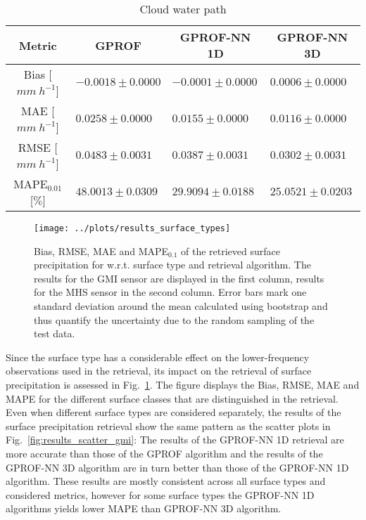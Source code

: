 \documentclass[a4paper,11pt,bibtotoc]{scrartcl}
\begin{document}
\begin{table}[hbpt!]
\begin{subtable}{\textwidth} 
 \caption{Cloud water path} 
\begin{tabular}{|c||p{3.5cm}|p{3.5cm}|p{3.5cm}|}
\hline
Metric &
\multicolumn{1}{|c}{GPROF} &
\multicolumn{1}{|c}{GPROF-NN 1D} &
\multicolumn{1}{|c|}{GPROF-NN 3D} \\
\hline\hline
Bias \hfill [$\unit{mm\ h^{-1}}$] & \hfill $ -0.0018 \pm 0.0000$ &\hfill $ -0.0001 \pm 0.0000$ &\hfill $  0.0006 \pm 0.0000$ \\
MAE \hfill [$\unit{mm\ h^{-1}}$] & \hfill $  0.0258 \pm 0.0000$ &\hfill $  0.0155 \pm 0.0000$ &\hfill $  0.0116 \pm 0.0000$ \\
RMSE \hfill [$\unit{mm\ h^{-1}}$] & \hfill $  0.0483 \pm 0.0031$ &\hfill $  0.0387 \pm 0.0031$ &\hfill $  0.0302 \pm 0.0031$ \\
MAPE$_{0.01}$ \hfill [$\unit{\%}$] & \hfill $ 48.0013 \pm 0.0309$ &\hfill $ 29.9094 \pm 0.0188$ &\hfill $ 25.0521 \pm 0.0203$ \\
\hline
\end{tabular}
\end{subtable}
\label{tab:surface_precip_metrics}
\end{table}

\begin{figure}[hbpt]
  \centering
  \texttt{[image: ../plots/results\_surface\_types]}
  \caption{
    Bias, RMSE, MAE and MAPE$_{0.1}$ of the retrieved surface precipitation for
    w.r.t. surface type and retrieval algorithm. The results for the GMI sensor
    are displayed in the first column, results for the MHS sensor in the
    second column. Error bars mark one standard deviation around the mean
    calculated using bootstrap and thus quantify the uncertainty due to the
    random sampling of the test data.
  }
  \label{fig:results_surface_types}
\end{figure}

Since the surface type has a considerable effect on the lower-frequency
observations used in the retrieval, its impact on the retrieval of surface
precipitation is assessed in Fig.~\ref{fig:results_surface_types}. The figure
displays the Bias, RMSE, MAE and MAPE for the different surface classes that are
distinguished in the retrieval. Even when different surface types are considered
separately, the results of the surface precipitation retrieval show the same
pattern as the scatter plots in Fig.~\ref{fig:results_scatter_gmi}: The results of
the GPROF-NN 1D retrieval are more accurate than those of the GPROF algorithm
and the results of the GPROF-NN 3D algorithm are in turn better than those of
the GPROF-NN 1D algorithm. These results are mostly consistent across all
surface types and considered metrics, however for some surface types the
GPROF-NN 1D algorithms yields lower MAPE than GPROF-NN 3D algorithm.
\end{document}
